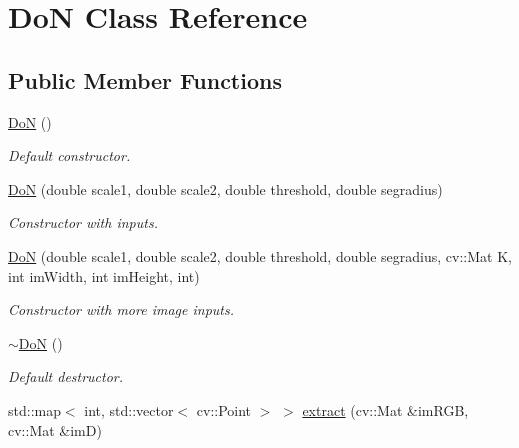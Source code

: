 \hypertarget{classDoN}{}\section{DoN Class Reference}
\label{classDoN}
\subsection*{Public Member Functions}
\begin{DoxyCompactItemize}
\item 
\mbox{\label{classDoN_a65b2219f2c0aa71596cf50608b1bb827}} 
\hyperlink{classDoN_a65b2219f2c0aa71596cf50608b1bb827}{DoN} ()
\begin{DoxyCompactList}\small\item\em Default constructor. \end{DoxyCompactList}\item 
\mbox{\label{classDoN_a9c5679670e784bddfca231c63122bce7}} 
\hyperlink{classDoN_a9c5679670e784bddfca231c63122bce7}{DoN} (double scale1, double scale2, double threshold, double segradius)
\begin{DoxyCompactList}\small\item\em Constructor with inputs. \end{DoxyCompactList}\item 
\mbox{\label{classDoN_a8583a85e01c683f503decb1a8a757682}} 
\hyperlink{classDoN_a8583a85e01c683f503decb1a8a757682}{DoN} (double scale1, double scale2, double threshold, double segradius, cv\+::\+Mat K, int im\+Width, int im\+Height, int)
\begin{DoxyCompactList}\small\item\em Constructor with more image inputs. \end{DoxyCompactList}\item 
\mbox{\label{classDoN_a4544ca7d9278dffa111202464c005aad}} 
\hyperlink{classDoN_a4544ca7d9278dffa111202464c005aad}{$\sim$\+DoN} ()
\begin{DoxyCompactList}\small\item\em Default destructor. \end{DoxyCompactList}\item 
std\+::map$<$ int, std\+::vector$<$ cv\+::\+Point $>$ $>$ \hyperlink{classDoN_ae1e63b9178dad44c2ced58bd571253cd}{extract} (cv\+::\+Mat \&im\+R\+GB, cv\+::\+Mat \&imD)

\end{DoxyCompactItemize}

